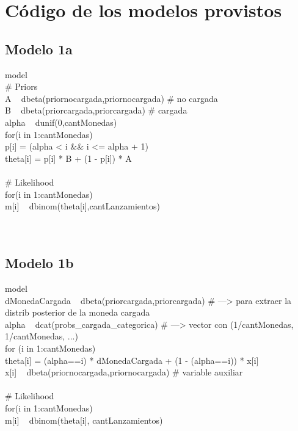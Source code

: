 \documentclass[a4paper]{article}
\begin{document}
\section {Código de los modelos provistos}

\subsection{Modelo 1a}
 
model { \\
    # Priors \\
    A ~ dbeta(priornocargada,priornocargada)  # no cargada \\
    B ~ dbeta(priorcargada,priorcargada)  # cargada \\
    alpha ~ dunif(0,cantMonedas) \\
    for(i in 1:cantMonedas) { \\
      p[i] = (alpha < i && i <= alpha + 1) \\
      theta[i] = p[i] * B + (1 - p[i]) * A \\
    } \\

    # Likelihood \\
    for(i in 1:cantMonedas) { \\
      m[i] ~ dbinom(theta[i],cantLanzamientos) \\
    } \\
} \\           

\subsection{Modelo 1b}

model { \\
   dMonedaCargada ~ dbeta(priorcargada,priorcargada) # ---> para extraer la distrib posterior de la moneda cargada \\
   alpha ~ dcat(probs_cargada_categorica)   # ---> vector con (1/cantMonedas, 1/cantMonedas, ...) \\
   for (i in 1:cantMonedas) { \\
     theta[i] = (alpha==i) * dMonedaCargada + (1 - (alpha==i)) * x[i] \\
     x[i] ~ dbeta(priornocargada,priornocargada) # variable auxiliar \\
   } \\
   # Likelihood \\
   for(i in 1:cantMonedas) { \\
    m[i] ~ dbinom(theta[i], cantLanzamientos) \\
   } \\
} \\
\end{document}
